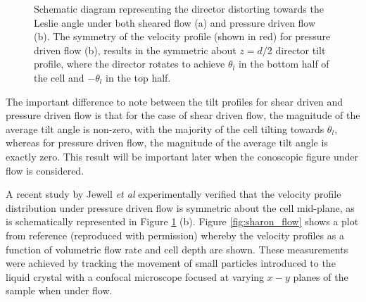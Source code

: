 \begin{figure}
\begin{center}
\hspace{0.1in}
\end{center}
\caption[Comparison of flow profiles. Shear flow and pressure-driven flow]{\label{fig:c_p}Schematic diagram representing the director distorting towards the Leslie angle under both sheared flow (a) and pressure driven flow (b). The symmetry of the velocity profile (shown in red) for pressure driven flow (b), results in the symmetric about $z=d/2$ director tilt profile, where the director rotates to achieve $\theta_l$ in the bottom half of the cell and $-\theta_l$ in the top half.}
\end{figure}

The important difference to note between the tilt profiles for shear driven and pressure driven flow is that for the case of shear driven flow, the magnitude of the average tilt angle is non-zero, with the majority of the cell tilting towards $\theta_l$, whereas for pressure driven flow, the magnitude of the average tilt angle is exactly zero. This result will be important later when the conoscopic figure under flow is considered.

A recent study by Jewell \textit{et al} \cite{Jewell2009} experimentally verified that the velocity profile distribution under pressure driven flow is symmetric about the cell mid-plane, as is schematically represented in Figure \ref{fig:c_p} (b). Figure \ref{fig:sharon_flow} shows a plot from reference \cite{Jewell2009} (reproduced with permission) whereby the velocity profiles as a function of volumetric flow rate and cell depth are shown. These measurements were achieved by tracking the movement of small particles introduced to the liquid crystal with a confocal microscope focused at varying $x-y$ planes of the sample when under flow.   

